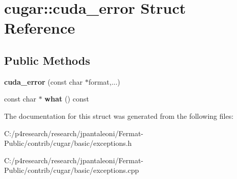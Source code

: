 \hypertarget{structcugar_1_1cuda__error}{}\section{cugar\+:\+:cuda\+\_\+error Struct Reference}
\label{structcugar_1_1cuda__error}
\subsection*{Public Methods}
\begin{DoxyCompactItemize}
\item 
\mbox{\label{structcugar_1_1cuda__error_aa9fd5d7d7e0424b85bbb053ca8c72007}} 
{\bfseries cuda\+\_\+error} (const char $\ast$format,...)
\item 
\mbox{\label{structcugar_1_1cuda__error_abe8a0afb52b0b5f2ab9d7b6285ce8368}} 
const char $\ast$ {\bfseries what} () const
\end{DoxyCompactItemize}


The documentation for this struct was generated from the following files\+:\begin{DoxyCompactItemize}
\item 
C\+:/p4research/research/jpantaleoni/\+Fermat-\/\+Public/contrib/cugar/basic/exceptions.\+h\item 
C\+:/p4research/research/jpantaleoni/\+Fermat-\/\+Public/contrib/cugar/basic/exceptions.\+cpp\end{DoxyCompactItemize}
